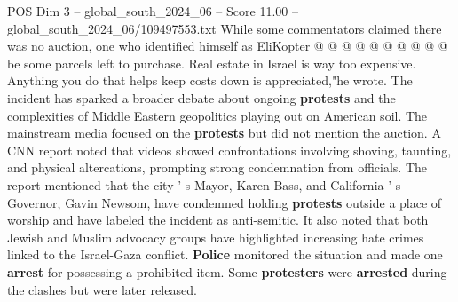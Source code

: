 \begin{textsample}{POS Dim 3 – global\_south\_2024\_06 – Score 11.00 – global\_south\_2024\_06/109497553.txt}
While some commentators claimed there was no auction, one who identified himself as EliKopter @ @ @ @ @ @ @ @ @ @ be some parcels left to purchase.
Real estate in Israel is way too expensive.
Anything you do that helps keep costs down is appreciated,"he wrote.
The incident has sparked a broader debate about ongoing \textbf{protests} and the complexities of Middle Eastern geopolitics playing out on American soil.
The mainstream media focused on the \textbf{protests} but did not mention the auction.
A CNN report noted that videos showed confrontations involving shoving, taunting, and physical altercations, prompting strong condemnation from officials.
The report mentioned that the city ' s Mayor, Karen Bass, and California ' s Governor, Gavin Newsom, have condemned holding \textbf{protests} outside a place of worship and have labeled the incident as anti-semitic.
It also noted that both Jewish and Muslim advocacy groups have highlighted increasing hate crimes linked to the Israel-Gaza conflict. \textbf{Police} monitored the situation and made one \textbf{arrest} for possessing a prohibited item.
Some \textbf{protesters} were \textbf{arrested} during the clashes but were later released.

\end{textsample}
